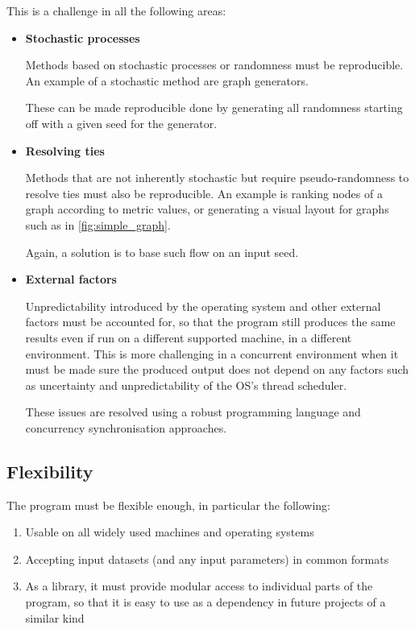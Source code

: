 This is a challenge in all the following areas:
\begin{itemize}
    \item \textbf{Stochastic processes}

    Methods based on stochastic processes or randomness must be reproducible.
    An example of a stochastic method are graph generators.

    These can be made reproducible done by generating all randomness starting off with a given seed for the generator.

    \item \textbf{Resolving ties}

    Methods that are not inherently stochastic but require pseudo-randomness to resolve ties must also be reproducible.
    An example is ranking nodes of a graph according to metric values, or generating a visual layout for graphs such as in \autoref{fig:simple_graph}.

    Again, a solution is to base such flow on an input seed.

    \item \textbf{External factors}

    Unpredictability introduced by the operating system and other external factors must be accounted for, so that the program still produces the same results even if run on a different supported machine, in a different environment.
    This is more challenging in a concurrent environment when it must be made sure the produced output does not depend on any factors such as uncertainty and unpredictability of the OS's thread scheduler.

    These issues are resolved using a robust programming language and concurrency synchronisation approaches.
\end{itemize}

\subsection{Flexibility}

The program must be flexible enough, in particular the following:
\begin{enumerate}
    \item Usable on all widely used machines and operating systems
    \item Accepting input datasets (and any input parameters) in common formats
    \item As a library, it must provide modular access to individual parts of the program, so that it is easy to use \graffs as a dependency in future projects of a similar kind
\end{enumerate}


